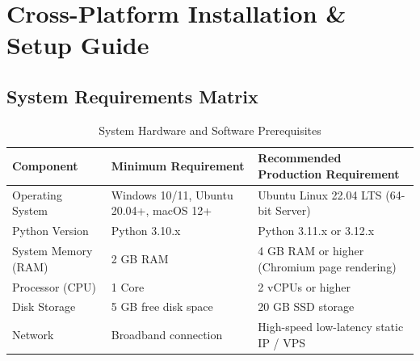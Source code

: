 \documentclass[11pt,a4paper]{report}
\begin{document}
\chapter{Cross-Platform Installation \& Setup Guide}

\section{System Requirements Matrix}
\begin{table}[h!]
\centering
\small
\begin{tabularx}{\textwidth}{l X X}
\toprule
\textbf{Component} & \textbf{Minimum Requirement} & \textbf{Recommended Production Requirement} \\
\midrule
Operating System & Windows 10/11, Ubuntu 20.04+, macOS 12+ & Ubuntu Linux 22.04 LTS (64-bit Server) \\
Python Version & Python 3.10.x & Python 3.11.x or 3.12.x \\
System Memory (RAM) & 2 GB RAM & 4 GB RAM or higher (Chromium page rendering) \\
Processor (CPU) & 1 Core & 2 vCPUs or higher \\
Disk Storage & 5 GB free disk space & 20 GB SSD storage \\
Network & Broadband connection & High-speed low-latency static IP / VPS \\
\bottomrule
\end{tabularx}
\caption{System Hardware and Software Prerequisites}
\label{tab:prereqs}
\end{table}
\end{document}

